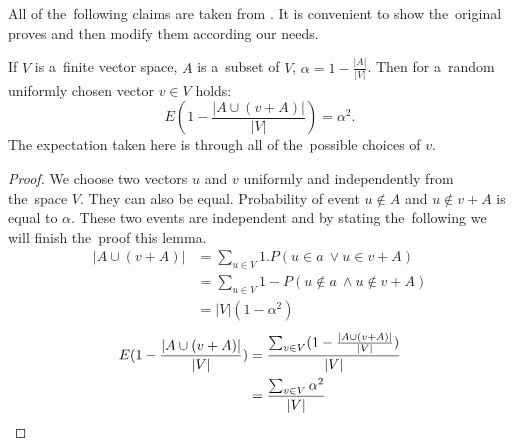 All of the~following claims are taken from \cite{linear-hash-functions}. It is convenient to show the~original proves and then modify them according our needs.

\begin{lemma}
\label{lemma-choose-random-vector}
If $V$ is a~finite vector space, $A$ is a~subset of $V$, $\alpha = 1 - \frac{|A|}{|V|}$. Then for a~random uniformly chosen vector $v \in V$ holds:
\begin{displaymath}
E (1 - \frac{|A \cup (v + A)|}{|V|}) = \alpha^2 \textit{.}
\end{displaymath}
The expectation taken here is through all of the~possible choices of $v$.
\end{lemma}
\begin{proof}
We choose two vectors $u$ and $v$ uniformly and independently from the~space $V$. They can also be equal. Probability of event $u \notin A$ and $u \notin v + A$ is equal to $\alpha$. These two events are independent and by stating the~following we will finish the~proof this lemma.
\begin{displaymath}
\begin{split}
|A \cup (v + A)| 
	& = \sum_{u \in V} 1 . P(u \in a~\vee u \in v + A) \\ 
	& = \sum_{u \in V} 1 - P(u \notin a~\wedge u \notin v + A) \\ 
	& = |V| (1 - \alpha ^ 2)
\end{split}
\end{displaymath}
\begin{displaymath}
\begin{split}
E (1 - \frac{|A \cup (v + A)|}{|V|}) 
	& = \frac{\sum\displaylimits_{v \in V}(1 - \frac{|A \cup (v + A)|}{|V|})}{|V|} \\
	& = \frac{\sum\displaylimits_{v \in V}\alpha ^ 2}{|V|}
\end{split}
\end{displaymath}
\end{proof}

